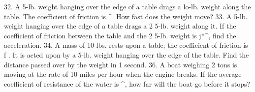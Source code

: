 32. A 5-lb. weight hanging over the edge of a table drags a lo-lb. weight along the table. The coefficient of friction is ^. How fast does the weight move?
33. A 5-lb. weight hanging over the edge of a table drags a 2 5-lb. weight along it. If the coefficient of friction between the table and the 2 5-lb. weight is j*^, find the acceleration.
34. A mass of 10 lbs. rests upon a table; the coefficient of friction is f . It is acted upon by a 5-lb. weight hanging over the edge of the table. Find the distance passed over by the weight in 1 second.
36. A boat weighing 2 tons is moving at the rate of 10 miles per hour when the engine breaks. If the average coefficient of resistance of the water is ^, how far will the boat go before it stops?